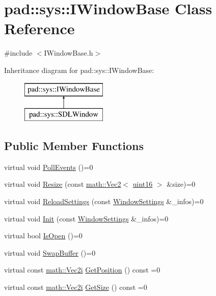 \hypertarget{classpad_1_1sys_1_1_i_window_base}{}\section{pad\+:\+:sys\+:\+:I\+Window\+Base Class Reference}
\label{classpad_1_1sys_1_1_i_window_base}


{\ttfamily \#include $<$I\+Window\+Base.\+h$>$}

Inheritance diagram for pad\+:\+:sys\+:\+:I\+Window\+Base\+:\begin{figure}[H]
\begin{center}
\leavevmode
\includegraphics[height=2.000000cm]{classpad_1_1sys_1_1_i_window_base}
\end{center}
\end{figure}
\subsection*{Public Member Functions}
\begin{DoxyCompactItemize}
\item 
virtual void \mbox{\hyperlink{classpad_1_1sys_1_1_i_window_base_aee21db35ea6bdd4299783b4e96a9b326}{Poll\+Events}} ()=0
\item 
virtual void \mbox{\hyperlink{classpad_1_1sys_1_1_i_window_base_a19fff5f21c5a75082d8ca4e2491b269e}{Resize}} (const \mbox{\hyperlink{namespacepad_1_1math_a9773bcf81aa2ddd829bc327d822c6552}{math\+::\+Vec2}}$<$ \mbox{\hyperlink{namespacepad_a03b9241a5f6a191da2faac64714e1038}{uint16}} $>$ \&size)=0
\item 
virtual void \mbox{\hyperlink{classpad_1_1sys_1_1_i_window_base_aff693c784fbf16ae5bbfce797f570879}{Reload\+Settings}} (const \mbox{\hyperlink{structpad_1_1sys_1_1_window_settings}{Window\+Settings}} \&\+\_\+infos)=0
\item 
virtual void \mbox{\hyperlink{classpad_1_1sys_1_1_i_window_base_aee66a6eacff6126f4106a8e725bcbf1f}{Init}} (const \mbox{\hyperlink{structpad_1_1sys_1_1_window_settings}{Window\+Settings}} \&\+\_\+infos)=0
\item 
virtual bool \mbox{\hyperlink{classpad_1_1sys_1_1_i_window_base_a07aae1254b0d8139e912584029d785ea}{Is\+Open}} ()=0
\item 
virtual void \mbox{\hyperlink{classpad_1_1sys_1_1_i_window_base_ac6fe9dea946b20c52ad8d9372e57e6c1}{Swap\+Buffer}} ()=0
\item 
virtual const \mbox{\hyperlink{namespacepad_1_1math_a808a631a6bccd994f9589d7fb86bad41}{math\+::\+Vec2i}} \mbox{\hyperlink{classpad_1_1sys_1_1_i_window_base_ac3cb42c492b8c2ba59f36da4702b7bec}{Get\+Position}} () const =0
\item 
virtual const \mbox{\hyperlink{namespacepad_1_1math_a808a631a6bccd994f9589d7fb86bad41}{math\+::\+Vec2i}} \mbox{\hyperlink{classpad_1_1sys_1_1_i_window_base_acf3540e89da05cc490cf981f196ad771}{Get\+Size}} () const =0
\end{DoxyCompactItemize}
